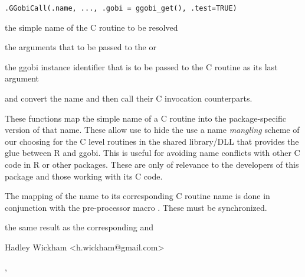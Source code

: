 \documentclass{article}
\begin{document}
\begin{Description}\relax
\end{Description}
\begin{Usage}
\begin{verbatim}.GGobiCall(.name, ..., .gobi = ggobi_get(), .test=TRUE)\end{verbatim}
\end{Usage}
\begin{Arguments}
\begin{ldescription}
\item[\code{.name}] the simple name of the C routine to be resolved
\item[\code{...}] the arguments that to be passed to the  or 
\item[\code{.gobi}] the ggobi instance identifier that is to be passed to the C routine as its last argument
\item[\code{.test}] 
\end{ldescription}
\end{Arguments}
\begin{Details}\relax
{} and  convert the name and then call
their C invocation counterparts.

These functions map the simple name of a C routine into the
package-specific version of that name.  These allow use to hide the
use a name \textit{mangling} scheme of our choosing for the C level
routines in the shared library/DLL that provides the glue between R
and ggobi.  This is useful for avoiding name conflicts with other C
code in R or other packages.  These are only of relevance to the
developers of this package and those working with its C code.

The mapping of the name to its corresponding C routine name
is done in conjunction with the pre-processor macro
. These  must be synchronized.
\end{Details}
\begin{Value}
the same result as the corresponding  and 
\end{Value}
\begin{Author}\relax
Hadley Wickham <h.wickham@gmail.com>
\end{Author}
\begin{SeeAlso}\relax
{}, 
\end{SeeAlso}
\begin{Examples}
\begin{ExampleCode}\end{ExampleCode}
\end{Examples}
\end{document}
